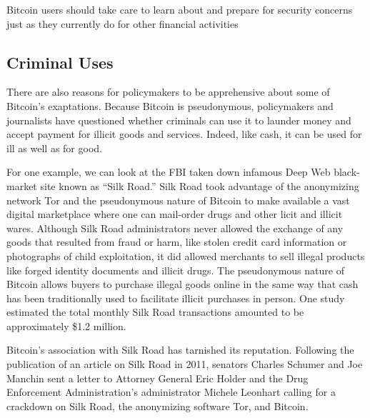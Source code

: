 Bitcoin users should take
care to learn about and prepare for security concerns just as they
currently do for other financial activities

\subsection{Criminal Uses}

There are also reasons for policymakers to be apprehensive
about some of Bitcoin’s exaptations. Because Bitcoin is pseudonymous,
policymakers and journalists have questioned whether
criminals can use it to launder money and accept payment for
illicit goods and services. Indeed, like cash, it can be used for ill
as well as for good\cite{kaplanov2012nerdy}.

For one example, we can look at the FBI taken down infamous Deep Web
black-market site known as “Silk Road.” Silk Road took advantage
of the anonymizing network Tor and the pseudonymous
nature of Bitcoin to make available a vast digital marketplace
where one can mail-order drugs and other licit and illicit wares.
Although Silk Road administrators never allowed the exchange
of any goods that resulted from fraud or harm, like stolen credit
card information or photographs of child exploitation, it did
allowed merchants to sell illegal products like forged identity documents
and illicit drugs. The pseudonymous nature of Bitcoin
allows buyers to purchase illegal goods online in the same way
that cash has been traditionally used to facilitate illicit purchases
in person. One study estimated the total monthly Silk Road
transactions amounted to be approximately \$1.2 million\cite{hanley2013false}.

Bitcoin’s association with Silk Road has tarnished its reputation.
Following the publication of an article on Silk Road in 2011, senators Charles Schumer and Joe Manchin sent a letter
to Attorney General Eric Holder and the Drug Enforcement
Administration’s administrator Michele Leonhart calling for
a crackdown on Silk Road, the anonymizing software Tor, and
Bitcoin.

